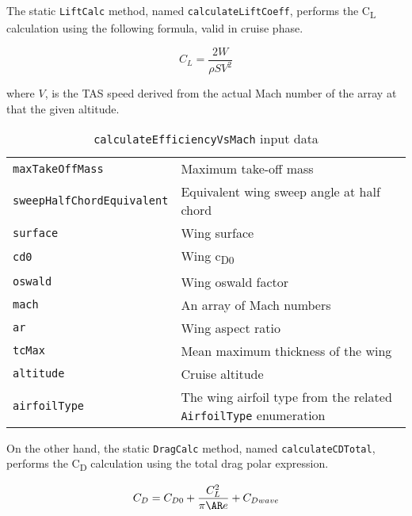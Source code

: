 The static \lstinline[language=Java]!LiftCalc! method, named \lstinline[language=Java]!calculateLiftCoeff!, performs the C\textsubscript{L} calculation using the following formula, valid in cruise phase.

\begin{equation}
C_L=\frac{2W}{\rho S V^2}
\label{eqn:Lift.Equation}
\end{equation}

\noindent
where $V$, is the TAS speed derived from the actual Mach number of the array at that the given altitude.

\begin{table}[b]
\begin{tabular}{p{7cm}p{7.5cm}}
\toprule
\lstinline[language=Java]!maxTakeOffMass! & Maximum take-off mass \\[0.1	cm]
\lstinline[language=Java]!sweepHalfChordEquivalent! & Equivalent wing sweep angle at half chord \\[0.1cm]
\lstinline[language=Java]!surface! & Wing surface \\[0.1cm]
\lstinline[language=Java]!cd0!	& Wing c\textsubscript{D0} \\[0.1cm]
\lstinline[language=Java]!oswald!	& Wing oswald factor \\[0.1cm]
\lstinline[language=Java]!mach!	& An array of Mach numbers \\[0.1cm]
\lstinline[language=Java]!ar!	& Wing aspect ratio \\[0.1cm]
\lstinline[language=Java]!tcMax! & Mean maximum thickness of the wing \\[0.1cm]
\lstinline[language=Java]!altitude! & Cruise altitude \\[0.1cm]
\lstinline[language=Java]!airfoilType! & The wing airfoil type from the related \lstinline[language=Java]!AirfoilType! enumeration \\
\bottomrule
\end{tabular}
\caption{ \lstinline[language=Java]!calculateEfficiencyVsMach! input data}
\label{table:Table1}
\end{table}

On the other hand, the static \lstinline[language=Java]!DragCalc! method, named \lstinline[language=Java]!calculateCDTotal!, performs the C\textsubscript{D} calculation using the total drag polar expression.

\begin{equation}
C_D=C_{D0}+\frac{C_L^2}{\pi \ensuremath{\AR} e}+C_{Dwave}
\label{eqn:Drag.Total}
\end{equation}

